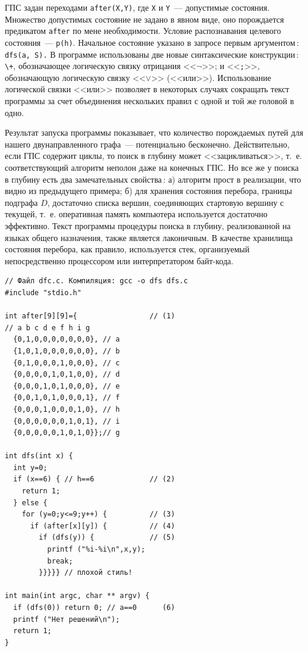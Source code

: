 \documentclass[a4paper,14pt, openany, twoside, draft]{extbook} %
\begin{document}
ГПС задан переходами \texttt{after(X,Y)}, где \texttt{X} и \texttt{Y}~--- допустимые состояния.  Множество допустимых состояние не задано в явном виде, оно порождается предикатом \texttt{after} по мене необходимости.  Условие распознавания целевого состояния~--- \texttt{p(h)}.  Начальное состояние указано в запросе первым аргументом\,: \texttt{dfs(a, S).}  В программе использованы две новые синтаксические конструкции\,: \texttt{\backslash +}, обозначающее логическую связку отрицания <<$\neg$>>; и <<\texttt{;}>>, обозначающую логическую связку <<$\vee$>> (<<или>>).  Использование логической связки <<или>> позволяет в некоторых случаях сокращать текст программы за счет объединения нескольких правил с одной и той же головой в одно.

Результат запуска программы показывает, что количество порождаемых путей для нашего двунаправленного графа~--- потенциально бесконечно.  Действительно, если ГПС содержит циклы, то поиск в глубину может <<зацикливаться>>, т.~е. соответствующий алгоритм неполон даже на конечных ГПС.  Но все же у поиска в глубину есть два замечательных свойства\,: а) алгоритм прост в реализации, что видно из предыдущего примера; б) для хранения состояния перебора, границы подграфа $D$, достаточно списка вершин, соединяющих стартовую вершину с текущей, т.~е. оперативная память компьютера используется достаточно эффективно.  Текст программы процедуры поиска в глубину, реализованной на языках общего назначения, также является лаконичным.  В качестве хранилища состояния перебора, как правило, используется стек, организуемый непосредственно процессором или интерпретатором байт-кода.

\begin{verbatim}
// Файл dfc.c. Компиляция: gcc -o dfs dfs.c
#include "stdio.h"

int after[9][9]={                 // (1)
// a b c d e f h i g
  {0,1,0,0,0,0,0,0,0}, // a
  {1,0,1,0,0,0,0,0,0}, // b
  {0,1,0,0,0,1,0,0,0}, // c
  {0,0,0,0,1,0,1,0,0}, // d
  {0,0,0,1,0,1,0,0,0}, // e
  {0,0,1,0,1,0,0,0,1}, // f
  {0,0,0,1,0,0,0,1,0}, // h
  {0,0,0,0,0,0,1,0,1}, // i
  {0,0,0,0,0,1,0,1,0}};// g

int dfs(int x) {
  int y=0;
  if (x==6) { // h==6             // (2)
    return 1;
  } else {
    for (y=0;y<=9;y++) {          // (3)
      if (after[x][y]) {          // (4)
        if (dfs(y)) {             // (5)
          printf ("%i-%i\n",x,y);
          break;
        }}}}} // плохой стиль!

int main(int argc, char ** argv) {
  if (dfs(0)) return 0; // a==0      (6)
  printf ("Нет решений\n");
  return 1;
}
\end{verbatim}
\end{document}
